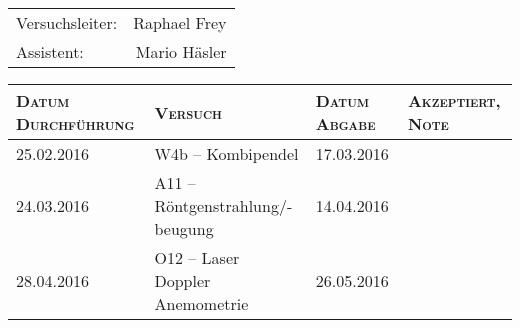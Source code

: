 \begin{titlepage}

    \maketitle

    \vspace{10mm}
    \begin{center}
    \begin{tabular}{lr}

        \Huge{Versuchsleiter:} & \Huge{Raphael Frey} \\
        \Huge{Assistent:} & \Huge{Mario H\"asler} \\

    \end{tabular}

    \vspace{20mm}

    \Large
    \begin{tabular}{p{27mm}|p{67mm}|p{23mm}|p{26mm}}


        \textsc{Datum Durchf\"uhrung} & \textsc{Versuch} & \textsc{Datum Abgabe} & \textsc{Akzeptiert, Note} \\
        [10mm]
        \hline
        25.02.2016 & W4b -- Kombipendel                     & 17.03.2016 & \\
        [10mm]
        24.03.2016 & A11 -- R\"ontgenstrahlung/-beugung     & 14.04.2016 & \\
        [10mm]
        28.04.2016 & O12 -- Laser Doppler Anemometrie       & 26.05.2016 & \\

    \end{tabular}
    \end{center}
    \normalsize

\end{titlepage}
